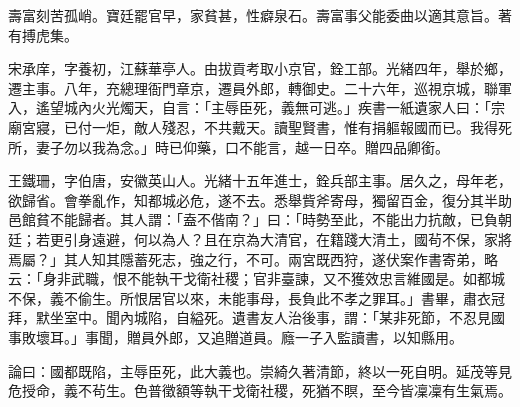 \begin{pinyinscope}
壽富刻苦孤峭。寶廷罷官早，家貧甚，性癖泉石。壽富事父能委曲以適其意旨。著有搏虎集。

宋承庠，字養初，江蘇華亭人。由拔貢考取小京官，銓工部。光緒四年，舉於鄉，遷主事。八年，充總理衙門章京，遷員外郎，轉御史。二十六年，巡視京城，聯軍入，遙望城內火光燭天，自言：「主辱臣死，義無可逃。」疾書一紙遺家人曰：「宗廟宮寢，已付一炬，敵人殘忍，不共戴天。讀聖賢書，惟有捐軀報國而已。我得死所，妻子勿以我為念。」時已仰藥，口不能言，越一日卒。贈四品卿銜。

王鐵珊，字伯唐，安徽英山人。光緒十五年進士，銓兵部主事。居久之，母年老，欲歸省。會拳亂作，知都城必危，遂不去。悉舉貲斧寄母，獨留百金，復分其半助邑館貧不能歸者。其人謂：「盍不偕南？」曰：「時勢至此，不能出力抗敵，已負朝廷；若更引身遠避，何以為人？且在京為大清官，在籍踐大清土，國茍不保，家將焉屬？」其人知其隱蓄死志，強之行，不可。兩宮既西狩，遂伏案作書寄弟，略云：「身非武職，恨不能執干戈衛社稷；官非臺諫，又不獲效忠言維國是。如都城不保，義不偷生。所恨居官以來，未能事母，長負此不孝之罪耳。」書畢，肅衣冠拜，默坐室中。聞內城陷，自縊死。遺書友人治後事，謂：「某非死節，不忍見國事敗壞耳。」事聞，贈員外郎，又追贈道員。廕一子入監讀書，以知縣用。

論曰：國都既陷，主辱臣死，此大義也。崇綺久著清節，終以一死自明。延茂等見危授命，義不茍生。色普徵額等執干戈衛社稷，死猶不瞑，至今皆凜凜有生氣焉。


\end{pinyinscope}